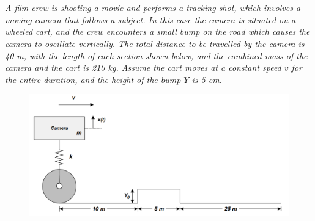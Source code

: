 \section{}

\textit{A film crew is shooting a movie and performs a tracking shot, which involves a moving camera that follows a subject. In this case the camera is situated on a wheeled cart, and the crew encounters a small bump on the road which causes the camera to oscillate vertically. The total distance to be travelled by the camera is 40 m, with the length of each section shown below, and the combined mass of the camera and the cart is 210 kg. Assume the cart moves at a constant speed $v$ for the entire duration, and the height of the bump $Y$ is 5 cm.}

\begin{figure}[H]
    \centering
    \includegraphics[width=0.8\linewidth]{Questions/Figures/Q2 Problem Diagram.png}
\end{figure}

